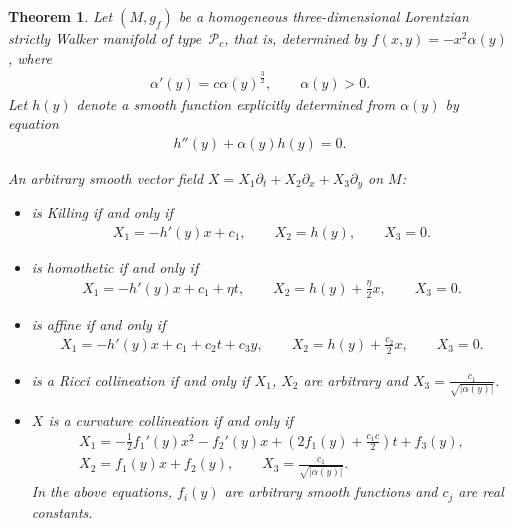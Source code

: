 \documentclass[pdftex]{sigma}
\numberwithin{equation}{section}
\newtheorem{Theorem}{Theorem}[section]
\begin{document}
\begin{Theorem}\label{Pc}
Let $(M,g_f)$ be a homogeneous three-dimensional Lorentzian strictly Walker mani\-fold of type~$\mathcal P_c$, that is, determined by $f(x,y)=-x^2\alpha(y)$, where \begin{gather*}\alpha '(y)=c\alpha(y)^{\frac32},\qquad \alpha(y)>0.\end{gather*}
Let $h(y)$ denote a smooth function explicitly determined from $\alpha(y)$ by equation
\begin{gather*}h''(y)+\alpha(y)h(y)=0.\end{gather*}

An arbitrary smooth vector field $X=X_1\partial_t+X_2\partial_x+X_3\partial_y$ on $M$:
\begin{itemize}\itemsep=0pt
\item is Killing if and only if
\begin{gather*}X_1=-h'(y) x+c_1,\qquad X_2=h(y),\qquad X_3=0.\end{gather*}
\item is homothetic if and only if
\begin{gather*}X_1=-h'(y)x+c_1+\eta t,\qquad X_2=h(y)+\frac\eta2 x,\qquad X_3=0.\end{gather*}
\item is affine if and only if
\begin{gather*}X_1=-h'(y)x+c_1+c_2t+c_3y,\qquad X_2=h(y)+\frac{c_2}{2}x,\qquad X_3=0.\end{gather*}
\item is a Ricci collineation if and only if $X_1$, $X_2$ are arbitrary and $X_3=\frac{c_1}{\sqrt{|\alpha(y)|}}$.
\item $X$ is a curvature collineation if and only if
\begin{gather*}
X_1=-\frac12f_1 '(y) x^2-f_2 '(y) x+\left(2f_1(y)+\frac{c_1c}{2}\right)t+f_3(y),\\ X_2=f_1(y)x+f_2(y),\qquad X_3=\frac{c_1}{\sqrt{|\alpha(y)|}}.
\end{gather*}
In the above equations, $f_i(y)$ are arbitrary smooth functions and $c_j$ are real constants.
\end{itemize}
\end{Theorem}
\end{document}
